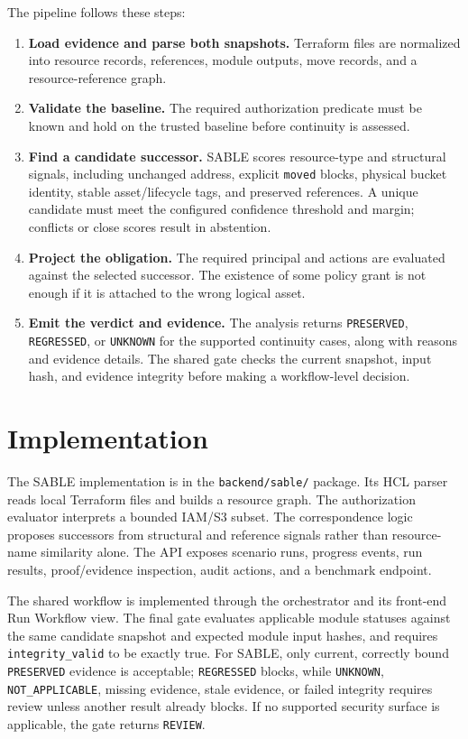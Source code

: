 The pipeline follows these steps:
\begin{enumerate}
    \item \textbf{Load evidence and parse both snapshots.} Terraform files are normalized into resource records, references, module outputs, move records, and a resource-reference graph.
    \item \textbf{Validate the baseline.} The required authorization predicate must be known and hold on the trusted baseline before continuity is assessed.
    \item \textbf{Find a candidate successor.} SABLE scores resource-type and structural signals, including unchanged address, explicit \texttt{moved} blocks, physical bucket identity, stable asset/lifecycle tags, and preserved references. A unique candidate must meet the configured confidence threshold and margin; conflicts or close scores result in abstention.
    \item \textbf{Project the obligation.} The required principal and actions are evaluated against the selected successor. The existence of some policy grant is not enough if it is attached to the wrong logical asset.
    \item \textbf{Emit the verdict and evidence.} The analysis returns \texttt{PRESERVED}, \texttt{REGRESSED}, or \texttt{UNKNOWN} for the supported continuity cases, along with reasons and evidence details. The shared gate checks the current snapshot, input hash, and evidence integrity before making a workflow-level decision.
\end{enumerate}

\section{Implementation}

The SABLE implementation is in the \texttt{backend/sable/} package. Its HCL parser reads local Terraform files and builds a resource graph. The authorization evaluator interprets a bounded IAM/S3 subset. The correspondence logic proposes successors from structural and reference signals rather than resource-name similarity alone. The API exposes scenario runs, progress events, run results, proof/evidence inspection, audit actions, and a benchmark endpoint.

The shared workflow is implemented through the orchestrator and its front-end Run Workflow view. The final gate evaluates applicable module statuses against the same candidate snapshot and expected module input hashes, and requires \texttt{integrity\_valid} to be exactly true. For SABLE, only current, correctly bound \texttt{PRESERVED} evidence is acceptable; \texttt{REGRESSED} blocks, while \texttt{UNKNOWN}, \texttt{NOT\_APPLICABLE}, missing evidence, stale evidence, or failed integrity requires review unless another result already blocks. If no supported security surface is applicable, the gate returns \texttt{REVIEW}.


